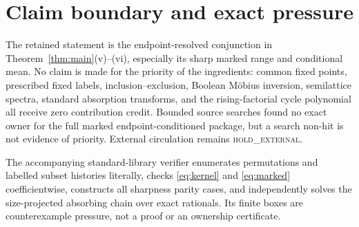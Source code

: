 \documentclass[a4paper,10pt]{amsart}
\theoremstyle{remark}
\begin{document}
\section{Claim boundary and exact pressure}

The retained statement is the endpoint-resolved conjunction in
Theorem~\ref{thm:main}(v)--(vi), especially its sharp marked range and
conditional mean.  No claim is made for the priority of the ingredients:
common fixed points, prescribed fixed labels, inclusion--exclusion, Boolean
M\"obius inversion, semilattice spectra, standard absorption transforms, and
the rising-factorial cycle polynomial all receive zero contribution credit.
Bounded source searches found no exact owner for the full marked
endpoint-conditioned package, but a search non-hit is not evidence of
priority.  External circulation remains \textsc{hold\_external}.

The accompanying standard-library verifier enumerates permutations and
labelled subset histories literally, checks \eqref{eq:kernel} and
\eqref{eq:marked} coefficientwise, constructs all sharpness parity cases,
and independently solves the size-projected absorbing chain over exact
rationals.  Its finite boxes are counterexample pressure, not a proof or an
ownership certificate.



\end{document}
